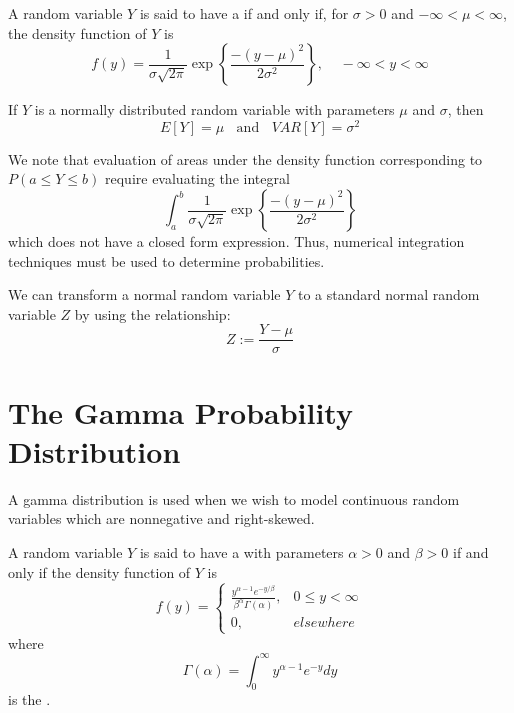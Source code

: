 \documentclass[12pt, a4paper, twoside, openright, titlepage]{book}
\begin{document}
\begin{defn}{}{}
    A random variable $Y$ is said to have a  if and only if, for $\sigma > 0$ and $-\infty < \mu < \infty$, the density function of $Y$ is \begin{equation*}
        f(y) = \frac{1}{\sigma \sqrt{2\pi}}\operatorname{exp}\left\{\frac{-(y-\mu)^2}{2\sigma^2}\right\},\;\;\;\;-\infty < y < \infty
    \end{equation*}
\end{defn}

\begin{thm}{}{}
    If $Y$ is a normally distributed random variable with parameters $\mu$ and $\sigma$, then \begin{equation*}
        E[Y] = \mu\;\;\text{ and } \;\;VAR[Y] = \sigma^2
    \end{equation*}
\end{thm}

We note that evaluation of areas under the density function corresponding to $P(a\leq Y \leq b)$ require evaluating the integral \begin{equation*}
    \int_a^b\frac{1}{\sigma \sqrt{2\pi}}\operatorname{exp}\left\{\frac{-(y-\mu)^2}{2\sigma^2}\right\}
\end{equation*}
which does not have a closed form expression. Thus, numerical integration techniques must be used to determine probabilities.

\begin{defn}{}{}
    We can transform a normal random variable $Y$ to a standard normal random variable $Z$ by using the relationship: \begin{equation*}
        Z := \frac{Y-\mu}{\sigma}
    \end{equation*}
\end{defn}


\section{\textsection The Gamma Probability Distribution}

A gamma distribution is used when we wish to model continuous random variables which are nonnegative and right-skewed.

\begin{defn}{}{}
    A random variable $Y$ is said to have a  with parameters $\alpha > 0$ and $\beta > 0$ if and only if the density function of $Y$ is \begin{equation*}
        f(y) = \left\{\begin{array}{lc} \frac{y^{\alpha - 1}e^{-y/\beta}}{\beta^{\alpha}\Gamma(\alpha)}, & 0\leq y < \infty \\ 0, & elsewhere \end{array}\right.
    \end{equation*}
    where \begin{equation*}
        \Gamma(\alpha) = \int_0^{\infty}y^{\alpha -1}e^{-y}dy
    \end{equation*}
    is the .
\end{defn}
\end{document}
